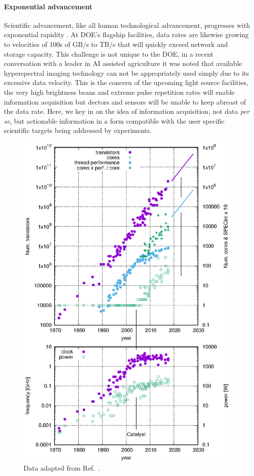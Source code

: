 \documentclass{article}
\begin{document}
\paragraph{Exponential advancement}
Scientific advancement, like all human technological advancement, progresses with exponential rapidity \cite{Kurzweil}.
At DOE's flagship facilities, data rates are likewise growing to velocities of 100s of GB/s to TB/s that will quickly exceed network and storage capacity.  
This challenge is not unique to the DOE, in a recent conversation with a leader in AI assisted agriculture it was noted that available hyperspectral imaging technology can not be appropriately used simply due to its excessive data velocity.
This is the concern of the upcoming light source facilities, the very high brightness beans and extreme pulse repetition rates will enable information acquisition but dectors and sensors will be unable to keep abreast of the data rate. 
Here, we key in on the idea of information acquisition, not data \textit{per se}, but actionable information in a form compatible with the user specific scientific targets being addressed by experiments.
\begin{figure}
	\centerline{ \includegraphics[clip,trim={-2cm -2cm 1.5cm 1.5cm},width=\linewidth]{plotting_technology.eps} }
	\caption{
		\label{fig::technology} 
		Data adapted from Ref.~\cite{MicroprocessorTrendData}. 
	}
\end{figure}
\end{document}
